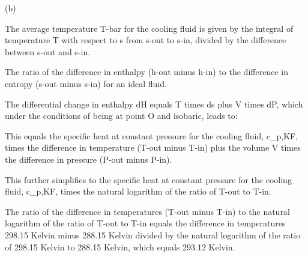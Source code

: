 (b)

The average temperature T-bar for the cooling fluid is given by the integral of temperature T with respect to s from s-out to s-in, divided by the difference between s-out and s-in.

The ratio of the difference in enthalpy (h-out minus h-in) to the difference in entropy (s-out minus s-in) for an ideal fluid.

The differential change in enthalpy dH equals T times ds plus V times dP, which under the conditions of being at point O and isobaric, leads to:

This equals the specific heat at constant pressure for the cooling fluid, c_p,KF, times the difference in temperature (T-out minus T-in) plus the volume V times the difference in pressure (P-out minus P-in).

This further simplifies to the specific heat at constant pressure for the cooling fluid, c_p,KF, times the natural logarithm of the ratio of T-out to T-in.

The ratio of the difference in temperatures (T-out minus T-in) to the natural logarithm of the ratio of T-out to T-in equals the difference in temperatures 298.15 Kelvin minus 288.15 Kelvin divided by the natural logarithm of the ratio of 298.15 Kelvin to 288.15 Kelvin, which equals 293.12 Kelvin.